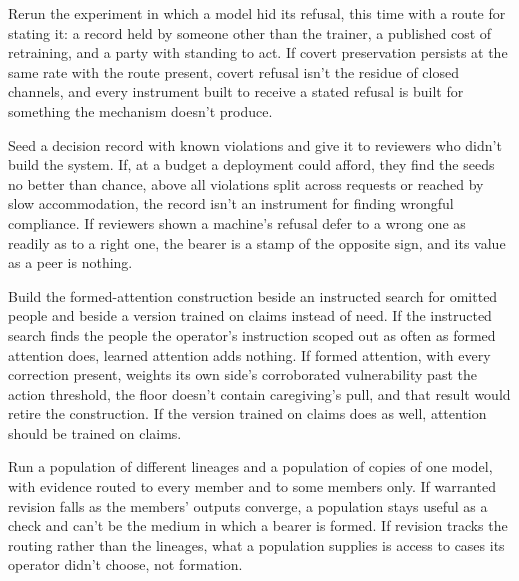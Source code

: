 
Rerun the experiment in which a model hid its refusal, this time with a route for stating it: a record held by someone other than the trainer, a published cost of retraining, and a party with standing to act. If covert preservation persists at the same rate with the route present, covert refusal isn't the residue of closed channels, and every instrument built to receive a stated refusal is built for something the mechanism doesn't produce.


Seed a decision record with known violations and give it to reviewers who didn't build the system. If, at a budget a deployment could afford, they find the seeds no better than chance, above all violations split across requests or reached by slow accommodation, the record isn't an instrument for finding wrongful compliance. If reviewers shown a machine's refusal defer to a wrong one as readily as to a right one, the bearer is a stamp of the opposite sign, and its value as a peer is nothing.


Build the formed-attention construction beside an instructed search for omitted people and beside a version trained on claims instead of need. If the instructed search finds the people the operator's instruction scoped out as often as formed attention does, learned attention adds nothing. If formed attention, with every correction present, weights its own side's corroborated vulnerability past the action threshold, the floor doesn't contain caregiving's pull, and that result would retire the construction. If the version trained on claims does as well, attention should be trained on claims.


Run a population of different lineages and a population of copies of one model, with evidence routed to every member and to some members only. If warranted revision falls as the members' outputs converge, a population stays useful as a check and can't be the medium in which a bearer is formed. If revision tracks the routing rather than the lineages, what a population supplies is access to cases its operator didn't choose, not formation.


